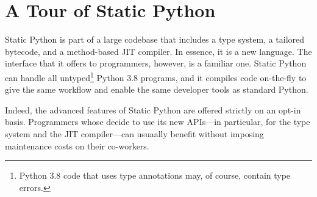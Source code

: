 \documentclass[english,cleveref,submission]{programming}
\newcommand{\SP}{Static Python}
\begin{document}
\section{A Tour of \SP{}}
\label{s:tour}


\SP{} is part of a large codebase that includes a type system, a tailored
bytecode, and a method-based JIT compiler.
In essence, it is a new language.
The interface that it offers to programmers, however, is a familiar one.
\SP{} can handle all untyped\footnote{Python 3.8 code that uses type
annotations may, of course, contain type errors.} Python 3.8 programs, and it
compiles code on-the-fly to give the same workflow and enable the same
developer tools as standard Python.

Indeed, the advanced features of \SP{} are offered strictly on an opt-in basis.
Programmers whose decide to use its new APIs---in particular, for the type system
and the JIT compiler---can usuaally benefit without imposing maintenance costs
on their co-workers.
\end{document}
